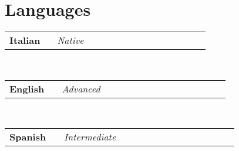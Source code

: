 \newcommand{\lang}[2]
  {\small \color{maincolor}
    \begin{tabular}{@{} p{0.2\linewidth} p{0.64\linewidth}}
      \textbf{\color{hlcolor-0} #1} & \emph{\color{maincolor} #2}
    \end{tabular}
  }


\section*{Languages}
\begin{cvcontent}
  \lang{Italian}{Native}\\ [0.5mm]
  \lang{English}{Advanced}\\ [0.5mm]
  \lang{Spanish}{Intermediate}
\end{cvcontent}